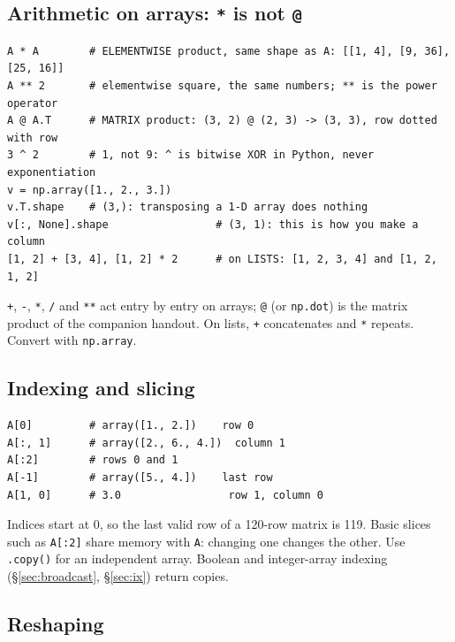 \documentclass[11pt]{article}
\begin{document}
\subsection{Arithmetic on arrays: \texttt{*} is not \texttt{@}}

\begin{codebox}
\begin{verbatim}
A * A        # ELEMENTWISE product, same shape as A: [[1, 4], [9, 36], [25, 16]]
A ** 2       # elementwise square, the same numbers; ** is the power operator
A @ A.T      # MATRIX product: (3, 2) @ (2, 3) -> (3, 3), row dotted with row
3 ^ 2        # 1, not 9: ^ is bitwise XOR in Python, never exponentiation
v = np.array([1., 2., 3.])
v.T.shape    # (3,): transposing a 1-D array does nothing
v[:, None].shape                 # (3, 1): this is how you make a column
[1, 2] + [3, 4], [1, 2] * 2      # on LISTS: [1, 2, 3, 4] and [1, 2, 1, 2]
\end{verbatim}
\end{codebox}

\texttt{+}, \texttt{-}, \texttt{*}, \texttt{/} and \texttt{**} act entry by entry on
arrays; \texttt{@} (or \texttt{np.dot}) is the matrix product of the companion handout.
On lists, \texttt{+} concatenates and \texttt{*} repeats. Convert with \texttt{np.array}.

\subsection{Indexing and slicing}

\begin{codebox}
\begin{verbatim}
A[0]         # array([1., 2.])    row 0
A[:, 1]      # array([2., 6., 4.])  column 1
A[:2]        # rows 0 and 1
A[-1]        # array([5., 4.])    last row
A[1, 0]      # 3.0                 row 1, column 0
\end{verbatim}
\end{codebox}

Indices start at 0, so the last valid row of a 120-row matrix is 119. Basic slices such as
\texttt{A[:2]} share memory with \texttt{A}: changing one changes the other. Use
\texttt{.copy()} for an independent array. Boolean and integer-array indexing (\S\ref{sec:broadcast}, \S\ref{sec:ix}) return copies.

\subsection{Reshaping}
\end{document}
